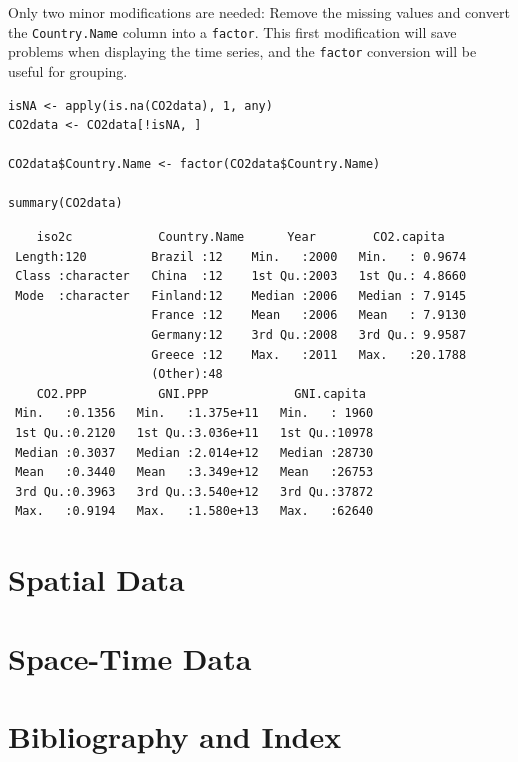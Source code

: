 \documentclass[smallroyalvopaper]{memoir}
\begin{document}
Only two minor modifications are needed: Remove the missing values and
convert the \texttt{Country.Name} column into a \texttt{factor}. This first
modification will save problems when displaying the time series, and
the \texttt{factor} conversion will be useful for grouping.

\lstset{language=r,label= ,caption= ,captionpos=b,numbers=none}
\begin{lstlisting}
isNA <- apply(is.na(CO2data), 1, any)
CO2data <- CO2data[!isNA, ]

CO2data$Country.Name <- factor(CO2data$Country.Name)

summary(CO2data)
\end{lstlisting}

\begin{verbatim}
    iso2c            Country.Name      Year        CO2.capita     
 Length:120         Brazil :12    Min.   :2000   Min.   : 0.9674  
 Class :character   China  :12    1st Qu.:2003   1st Qu.: 4.8660  
 Mode  :character   Finland:12    Median :2006   Median : 7.9145  
                    France :12    Mean   :2006   Mean   : 7.9130  
                    Germany:12    3rd Qu.:2008   3rd Qu.: 9.9587  
                    Greece :12    Max.   :2011   Max.   :20.1788  
                    (Other):48                                    
    CO2.PPP          GNI.PPP            GNI.capita   
 Min.   :0.1356   Min.   :1.375e+11   Min.   : 1960  
 1st Qu.:0.2120   1st Qu.:3.036e+11   1st Qu.:10978  
 Median :0.3037   Median :2.014e+12   Median :28730  
 Mean   :0.3440   Mean   :3.349e+12   Mean   :26753  
 3rd Qu.:0.3963   3rd Qu.:3.540e+12   3rd Qu.:37872  
 Max.   :0.9194   Max.   :1.580e+13   Max.   :62640
\end{verbatim}

\part{Spatial Data}
\label{sec:orga1743fb}

\part{Space-Time Data}
\label{sec:org3c33a8f}

\part{Bibliography and Index}
\label{sec:orge3749c1}

\backmatter

\printbibliography

\clearpage

\printindex
\end{document}
